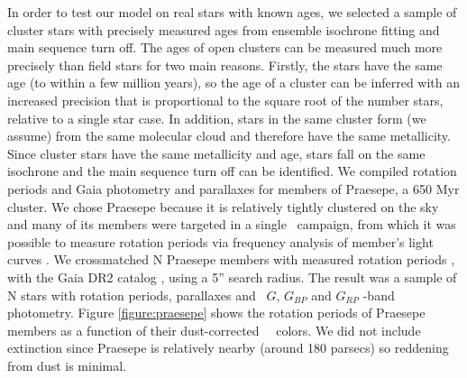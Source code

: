 In order to test our model on real stars with known ages, we selected a sample
of cluster stars with precisely measured ages from ensemble isochrone fitting
and main sequence turn off.
The ages of open clusters can be measured much more precisely than field
stars for two main reasons.
Firstly, the stars have the same age (to within a few million years), so the
age of a cluster can be inferred with an increased precision that is
proportional to the square root of the number stars, relative to a single star
case.
In addition, stars in the same cluster form (we assume) from the same
molecular cloud and therefore have the same metallicity.
Since cluster stars have the same metallicity and age, stars fall on the same
isochrone and the main sequence turn
off can be identified.
We compiled rotation periods and Gaia photometry and parallaxes for members of
Praesepe, a 650 Myr cluster.
We chose Praesepe because it is relatively tightly clustered on the sky and
many of its members were targeted in a single \ktwo\ campaign, from which it
was possible to measure rotation periods via frequency analysis of member's
light curves \citep{douglas2017}.
We crossmatched N Praesepe members with measured rotation periods
\citep{douglas2017}, with the Gaia DR2 catalog ,
using a 5'' search radius.
The result was a sample of N stars with rotation periods, parallaxes and
\gaia\ $G$, $G_{BP}$ and $G_{RP}$ -band photometry.
Figure \ref{figure:praesepe} shows the rotation periods of Praesepe members as
a function of their dust-corrected \gaia\ \gcolor\ colors.
We did not include extinction since Praesepe is relatively nearby (around 180
parsecs) so reddening from dust is minimal.

